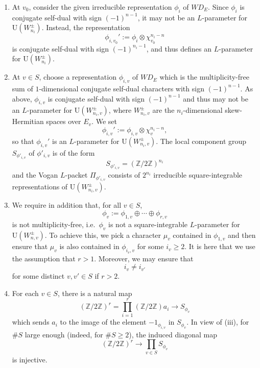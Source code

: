 \documentclass[11pt]{amsart}
\numberwithin{equation}{section}
\theoremstyle{plain}
\theoremstyle{definition}
\theoremstyle{remark}
\def\U{\mathrm{U}}
\def\WD{\mathit{WD}}
\def\ZZ{\mathbb{Z}}
\begin{document}
\begin{enumerate}

\item 
At $v_0$, consider the given irreducible representation $\phi_i$ of $\WD_E$. Since $\phi_i$ is conjugate self-dual with sign $(-1)^{n-1}$, it may not be an $L$-parameter for $\U(W_{n_i}^{\pm})$. Instead,  the representation 
\[  \phi_{i,v_0}' := \phi_i \otimes \chi_{v_0}^{n_i-n} \]
is conjugate self-dual with sign $(-1)^{n_i-1}$, and thus defines an $L$-parameter for $\U(W_{n_i}^{\pm})$.

\item
At $v \in S$, choose a representation $\phi_{i,v}$ of $\WD_E$ which is the multiplicity-free sum of $1$-dimensional conjugate self-dual characters with sign $(-1)^{n-1}$. As above, $\phi_{i,v}$ is conjugate self-dual with sign $(-1)^{n-1}$ and thus may not be an $L$-parameter for $\U(W_{n_i,v}^{\pm})$, where $W_{n_i,v}^{\pm}$ are the $n_i$-dimensional skew-Hermitian spaces over $E_v$. We set 
\[  \phi_{i,v}' := \phi_{i,v} \otimes \chi_v^{n_i-n}, \]
so that $\phi_{i,v}'$ is an $L$-parameter for $\U(W_{n_i,v}^\pm)$. The local component group $S_{\phi'_{i,v}}$ of $\phi'_{i,v}$ is of the form
\[  S_{\phi'_{i,v}}  =  (\ZZ / 2\ZZ)^{n_i} \]
and the Vogan $L$-packet $\Pi_{\phi'_{i,v}}$ consists of $2^{n_i}$ irreducible square-integrable representations of $\U(W_{n_i,v}^{\pm})$.

\item  We require in addition that, for all $v \in S$, 
\[  \phi_v := \phi_{1,v} \oplus \cdots \oplus \phi_{r,v} \] 
is not multiplicity-free, i.e.~$\phi_v$ is not a square-integrable $L$-parameter for $\U(W_{n,v}^{\pm})$. To achieve this, we pick a character $\mu_v$ contained in $\phi_{1,v}$ and then ensure that $\mu_v$ is also contained in $\phi_{i_v,v}$ for some $i_v \ge 2$. It is here that we use the assumption that $r > 1$. Moreover, we may ensure that
\[
 i_v \ne i_{v'} 
\]
for some distinct $v, v' \in S$ if $r > 2$.

\item For each $v \in S$, there is a natural map
\[  (\ZZ / 2 \ZZ)^r  = \prod_{i=1}^r (\ZZ / 2\ZZ) a_i \longrightarrow S_{\phi_v}  \]
which sends $a_i$ to the image of the element $-1_{\phi_{i,v}}$ in $S_{\phi_v}$. In view of (iii), for $\# S$ large enough (indeed, for $\# S \geq 2$), the induced diagonal map
\[  (\ZZ / 2\ZZ)^r  \longrightarrow  \prod_{v \in S} S_{\phi_v}  \]
is injective.  


\end{enumerate}
\end{document}

